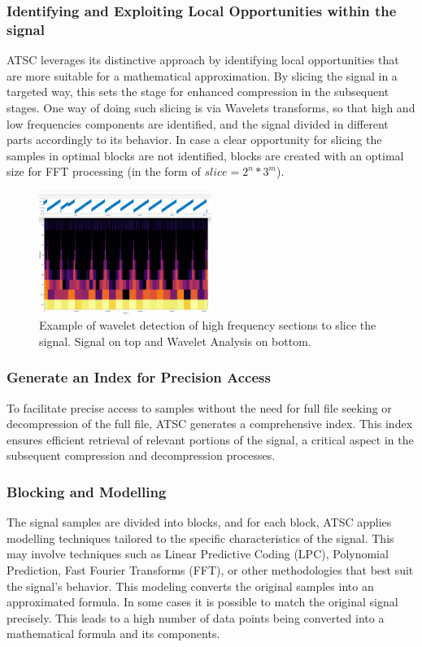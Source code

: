 \documentclass[conference]{IEEEtran}
\begin{document}
\vspace{10pt}
\subsubsection{Identifying and Exploiting Local Opportunities within the signal}
ATSC leverages its distinctive approach by identifying local opportunities that are more suitable for a mathematical approximation. By slicing the signal in a targeted way, this sets the stage for enhanced compression in the subsequent stages. One way of doing such slicing is via Wavelets transforms, so that high and low frequencies components are identified, and the signal divided in different parts accordingly to its behavior.
In case a clear opportunity for slicing the samples in optimal blocks are not identified, blocks are created with an optimal size for FFT processing (in the form of $slice = 2^n * 3^m$).

\begin{figure}[ht]
  \centering
  \includegraphics[width=0.5\textwidth]{wavelet_heap.png}
  \caption{Example of wavelet detection of high frequency sections to slice the signal. Signal on top and Wavelet Analysis on bottom.}
  \label{wavelet}
\end{figure}
\vspace{5pt}

\vspace{10pt}
\subsubsection{Generate an Index for Precision Access}
To facilitate precise access to samples without the need for full file seeking or decompression of the full file, ATSC generates a comprehensive index. This index ensures efficient retrieval of relevant portions of the signal, a critical aspect in the subsequent compression and decompression processes.

\vspace{10pt}
\subsubsection{Blocking and Modelling}
The signal samples are divided into blocks, and for each block, ATSC applies modelling techniques tailored to the specific characteristics of the signal. This may involve techniques such as Linear Predictive Coding (LPC), Polynomial Prediction, Fast Fourier Transforms (FFT), or other methodologies that best suit the signal's behavior. This modeling converts the original samples into an approximated formula. In some cases it is possible to match the original signal precisely. This leads to a high number of data points being converted into a mathematical formula and its components.
\end{document}
